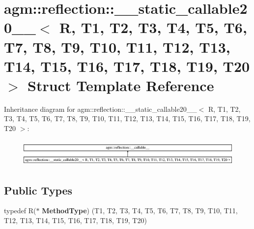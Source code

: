 \hypertarget{structagm_1_1reflection_1_1____static__callable20____}{}\section{agm\+:\+:reflection\+:\+:\+\_\+\+\_\+static\+\_\+callable20\+\_\+\+\_\+$<$ R, T1, T2, T3, T4, T5, T6, T7, T8, T9, T10, T11, T12, T13, T14, T15, T16, T17, T18, T19, T20 $>$ Struct Template Reference}
\label{structagm_1_1reflection_1_1____static__callable20____}
Inheritance diagram for agm\+:\+:reflection\+:\+:\+\_\+\+\_\+static\+\_\+callable20\+\_\+\+\_\+$<$ R, T1, T2, T3, T4, T5, T6, T7, T8, T9, T10, T11, T12, T13, T14, T15, T16, T17, T18, T19, T20 $>$\+:\begin{figure}[H]
\begin{center}
\leavevmode
\includegraphics[height=1.401752cm]{structagm_1_1reflection_1_1____static__callable20____}
\end{center}
\end{figure}
\subsection*{Public Types}
\begin{DoxyCompactItemize}
\item 
typedef R($\ast$ {\bfseries Method\+Type}) (T1, T2, T3, T4, T5, T6, T7, T8, T9, T10, T11, T12, T13, T14, T15, T16, T17, T18, T19, T20)\hypertarget{structagm_1_1reflection_1_1____static__callable20_____ac84aa29fbe8040884f9dcb10376a1d16}{}\label{structagm_1_1reflection_1_1____static__callable20_____ac84aa29fbe8040884f9dcb10376a1d16}

\end{DoxyCompactItemize}
